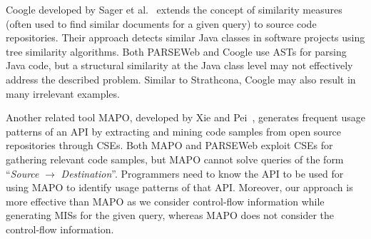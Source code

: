Coogle developed by Sager et al.~\cite{sager-msr06-clsim} extends
the concept of similarity measures (often used to find similar
documents for a given query) to source code repositories. Their
approach detects similar Java classes in software projects using
tree similarity algorithms. Both PARSEWeb and Coogle use ASTs for
parsing Java code, but a structural similarity at the Java class
level may not effectively address the described problem. Similar to
Strathcona, Coogle may also result in many irrelevant examples.

Another related tool MAPO, developed by Xie and Pei~\cite{mapo:xie},
generates frequent usage patterns of an API by extracting and mining
code samples from open source repositories through CSEs. Both MAPO and PARSEWeb exploit CSEs for
gathering relevant code samples, but MAPO cannot solve queries of
the form ``\emph{Source} $\rightarrow$ \emph{Destination}''.
Programmers need to know the API to be used for using MAPO to
identify usage patterns of that API. Moreover, our approach is more
effective than MAPO as we consider control-flow information while
generating MISs for the given query, whereas MAPO does not consider
the control-flow information.
